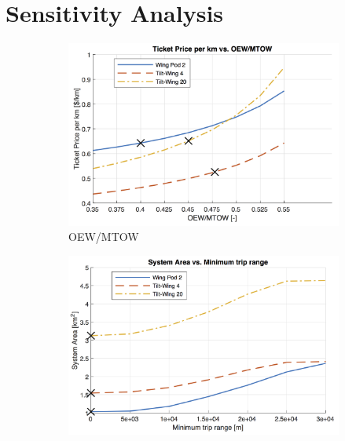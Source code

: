 \newpage
\chapter{Sensitivity Analysis} \label{ch:sensitivity}



\begin{figure}[H]
\begin{subfigure}[t]{0.33\textwidth}
    \centering
    \includegraphics[width=\textwidth]{Figures/OEWMTOW_TPrice_perkmNOPAD.png}
    \captionsetup{width=.8\linewidth}
    \caption{OEW/MTOW}
    \label{fig:sens1}
\end{subfigure}
\begin{subfigure}[t]{0.33\textwidth}
    \centering
    \includegraphics[width=\textwidth]{Figures/report_sys_area.png}
    \captionsetup{width=.8\linewidth}
    \caption{}
    \label{fig:sens2}
\end{subfigure}

\end{figure}
